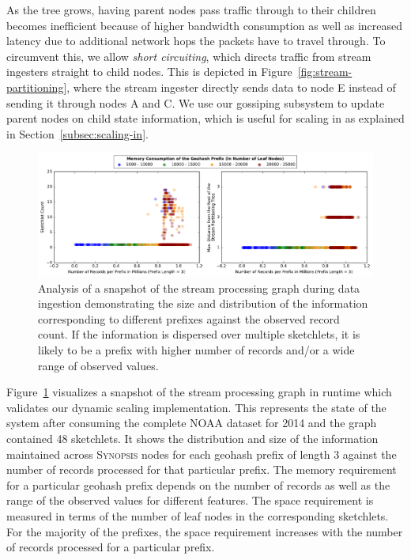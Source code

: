 As the tree grows, having parent nodes pass traffic through to their children becomes inefficient because of higher bandwidth consumption as well as increased latency due to additional network hops the packets have to travel through.
To circumvent this, we allow \emph{short circuiting}, which directs traffic from stream ingesters straight to child nodes.
This is depicted in Figure~\ref{fig:stream-partitioning}, where the stream ingester directly sends data to node E instead of sending it through nodes A and C.
We use our gossiping subsystem to update parent nodes on child state information, which is useful for scaling in as explained in Section~\ref{subsec:scaling-in}.
\begin{figure}[t!]
    \centerline{\includegraphics[width=\linewidth]{figures/scaleout_graph_analysis.pdf}}
    \caption{Analysis of a snapshot of the stream processing graph during data ingestion demonstrating the size and distribution of the information corresponding to different prefixes against the observed record count. If the information is dispersed over multiple sketchlets, it is likely to be a prefix with higher number of records and/or a wide range of observed values.}
    \label{fig:scaleout-graph-analysis}
\end{figure}
%
Figure~\ref{fig:scaleout-graph-analysis} visualizes a snapshot of the stream processing graph in runtime which validates our dynamic scaling implementation. 
This represents the state of the system after consuming the complete NOAA dataset for 2014 and the graph contained 48 sketchlets. 
It shows the distribution and size of the information maintained across \textsc{Synopsis} nodes for each geohash prefix of length 3 against the number of records processed for that particular prefix.
The memory requirement for a particular geohash prefix depends on the number of records as well as the range of the observed values for different features.
The space requirement is measured in terms of the number of leaf nodes in the corresponding sketchlets.
For the majority of the prefixes, the space requirement increases with the number of records processed for a particular prefix.
